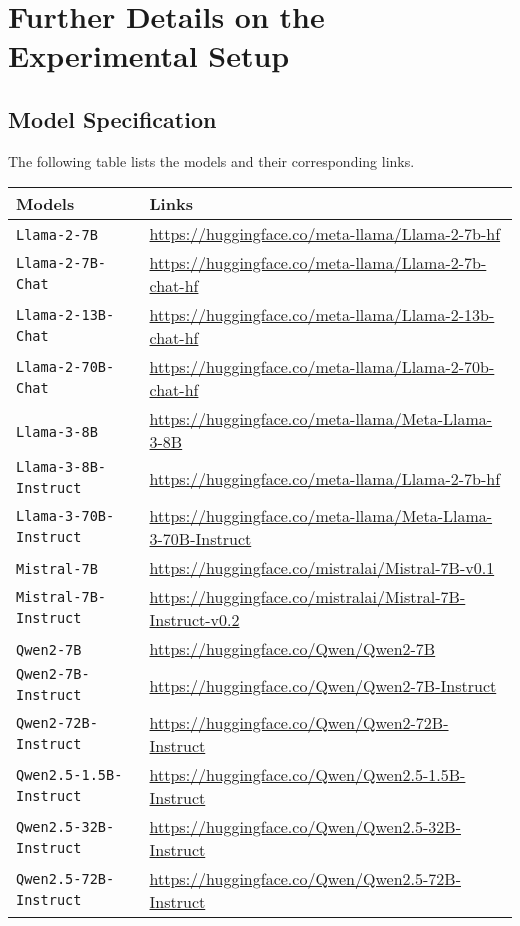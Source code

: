 \newpage
\appendix
\onecolumn
\section{Further Details on the Experimental Setup}
\subsection{Model Specification}
The following table lists the models and their corresponding links.
\label{appendix:model_specification_and_links}

\begin{longtable}{p{7cm}p{9cm}}
\toprule
\textbf{Models} & \textbf{Links} \\
\midrule
\texttt{Llama-2-7B}~\citep{touvron2023llama2} & \url{https://huggingface.co/meta-llama/Llama-2-7b-hf} \\
\texttt{Llama-2-7B-Chat}~\citep{touvron2023llama2} & \url{https://huggingface.co/meta-llama/Llama-2-7b-chat-hf} \\
\texttt{Llama-2-13B-Chat}~\citep{touvron2023llama2} & \url{https://huggingface.co/meta-llama/Llama-2-13b-chat-hf} \\
\texttt{Llama-2-70B-Chat}~\citep{touvron2023llama2} & \url{https://huggingface.co/meta-llama/Llama-2-70b-chat-hf} \\
\texttt{Llama-3-8B}~\citep{llama3modelcard} & \url{https://huggingface.co/meta-llama/Meta-Llama-3-8B} \\
\texttt{Llama-3-8B-Instruct}~\citep{llama3modelcard} & \url{https://huggingface.co/meta-llama/Llama-2-7b-hf} \\
\texttt{Llama-3-70B-Instruct}~\citep{llama3modelcard} & \url{https://huggingface.co/meta-llama/Meta-Llama-3-70B-Instruct} \\
\texttt{Mistral-7B}~\citep{jiang2023mistral7b} & \url{https://huggingface.co/mistralai/Mistral-7B-v0.1} \\
\texttt{Mistral-7B-Instruct}~\citep{jiang2023mistral7b} & \url{https://huggingface.co/mistralai/Mistral-7B-Instruct-v0.2} \\
\texttt{Qwen2-7B}~\citep{qwen2} & \url{https://huggingface.co/Qwen/Qwen2-7B} \\
\texttt{Qwen2-7B-Instruct}~\citep{qwen2} & \url{https://huggingface.co/Qwen/Qwen2-7B-Instruct} \\
\texttt{Qwen2-72B-Instruct}~\citep{qwen2} & \url{https://huggingface.co/Qwen/Qwen2-72B-Instruct} \\
\texttt{Qwen2.5-1.5B-Instruct}~\citep{qwen2.5} & \url{https://huggingface.co/Qwen/Qwen2.5-1.5B-Instruct} \\
\texttt{Qwen2.5-32B-Instruct}~\citep{qwen2.5} & \url{https://huggingface.co/Qwen/Qwen2.5-32B-Instruct} \\
\texttt{Qwen2.5-72B-Instruct}~\citep{qwen2.5} & \url{https://huggingface.co/Qwen/Qwen2.5-72B-Instruct} \\
\bottomrule
\end{longtable}


